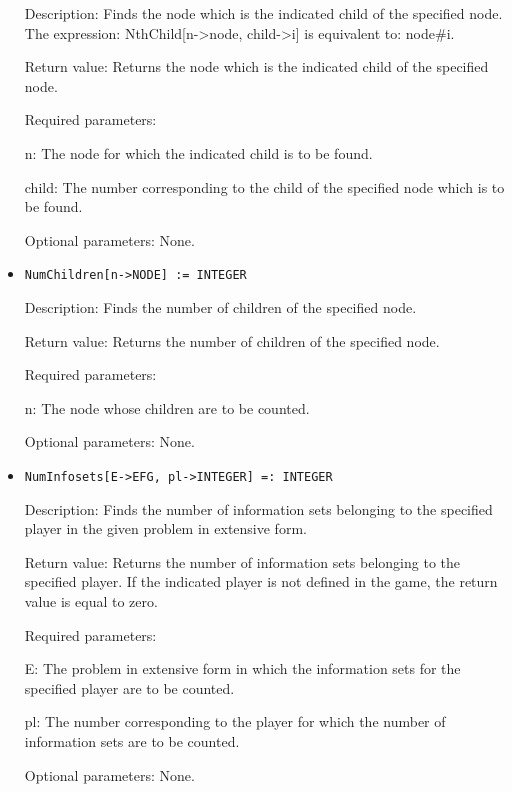 \begin{itemize}
\bd
\item
[Description:] Finds the node which is the indicated child of the
specified node.  The expression: NthChild[n->node, child->i] is
equivalent to: node\#i.
\item
[Return value:] Returns the node which is the indicated child of the
specified node.
\item
[Required parameters:]\hfil\null
	  
\bd
\item
[n:] The node for which the indicated child is to be found.
\item
[child:] The number corresponding to the child of the specified node
which is to be found.
\ed

\item 
[Optional parameters:] None.
\ed

\item
\protect \large \begin{verbatim}
NumChildren[n->NODE] := INTEGER
\end{verbatim}\normalsize

\bd
\item
[Description:] Finds the number of children of the specified node.
\item
[Return value:] Returns the number of children of the specified node.
\item
[Required parameters:]\hfil\null

\bd
\item
[n:] The node whose children are to be counted.
\ed

\item
[Optional parameters:] None.
\ed

\item
\protect \large \begin{verbatim}
NumInfosets[E->EFG, pl->INTEGER] =: INTEGER
\end{verbatim}\normalsize

\bd
\item
[Description:] Finds the number of information sets belonging to the
specified player in the given problem in extensive form.
\item
[Return value:] Returns the number of information sets belonging to
the specified player.  If the indicated player is not defined in the
game, the return value is equal to zero.
\item
[Required parameters:]\hfil\null

\bd
\item
[E:] The problem in extensive form in which the information sets for
the specified player are to be counted.
\item
[pl:] The number corresponding to the player for which the number of
information sets are to be counted.
\ed
\item
 [Optional parameters:] None.
\ed


\end{itemize}
